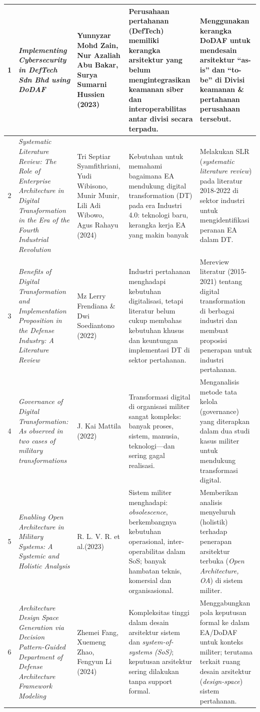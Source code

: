 \begin{longtable}{|c|p{3cm}|p{3cm}|p{3cm}|p{3cm}|}
1 & \textit{Implementing Cybersecurity in DefTech Sdn Bhd using DoDAF} 
& Yunnyzar Mohd Zain, Nur Azaliah Abu Bakar, Surya Sumarni Hussien (2023) \parencite{Zain2023}
& Perusahaan pertahanan (DefTech) memiliki kerangka arsitektur yang belum mengintegrasikan keamanan siber dan interoperabilitas antar divisi secara terpadu. 
& Menggunakan kerangka DoDAF untuk mendesain arsitektur “as-is” dan “to-be” di Divisi keamanan \& pertahanan perusahaan tersebut. \\
\hline
2 & \textit{Systematic Literature Review: The Role of Enterprise Architecture in Digital Transformation in the Era of the Fourth Industrial Revolution} 
& Tri Septiar Syamfithriani, Yudi Wibisono, Munir Munir, Lili Adi Wibowo, Agus Rahayu (2024) \parencite{Syamfithriani}
& Kebutuhan untuk memahami bagaimana EA mendukung digital transformation (DT) pada era Industri 4.0: teknologi baru, kerangka kerja EA yang makin banyak
& Melakukan SLR (\textit{systematic literature review}) pada literatur 2018-2022 di sektor industri untuk mengidentifikasi peranan EA dalam DT. \\
\hline
3 & \textit{Benefits of Digital Transformation and Implementation Proposition in the Defense Industry: A Literature Review}
& Mz Lerry Frendiana \& Dwi Soediantono (2022) \parencite{Frendiana2022}
& Industri pertahanan menghadapi kebutuhan digitalisasi, tetapi literatur belum cukup membahas kebutuhan khusus dan keuntungan implementasi DT di sektor pertahanan.
& Mereview literatur (2015-2021) tentang digital transformation di berbagai industri dan membuat proposisi penerapan untuk industri pertahanan. \\
\hline
4 & \textit{Governance of Digital Transformation: As observed in two cases of military transformations}
& J. Kai Mattila (2022) \parencite{Mattila2022}
& Transformasi digital di organisasi militer sangat kompleks: banyak proses, sistem, manusia, teknologi—dan sering gagal realisasi.
& Menganalisis metode tata kelola (governance) yang diterapkan dalam dua studi kasus militer untuk mendukung transformasi digital. \\
\hline
5 & \textit{Enabling Open Architecture in Military Systems: A Systemic and Holistic Analysis}
& R. L. V. R. et al.(2023) \parencite{Radoman2025}
& Sistem militer menghadapi: \textit{obsolescence}, berkembangnya kebutuhan operasional, inter-operabilitas dalam SoS; banyak hambatan teknis, komersial dan organisasional.
& Memberikan analisis menyeluruh (holistik) terhadap penerapan arsitektur terbuka (\textit{Open Architecture, OA}) di sistem militer. \\
\hline
6 & \textit{Architecture Design Space Generation via Decision Pattern-Guided Department of Defense Architecture Framework Modeling}
& Zhemei Fang, Xuemeng Zhao, Fengyun Li (2024) \parencite{Fang2024}
& Kompleksitas tinggi dalam desain arsitektur sistem dan \textit{system-of-systems (SoS)}; keputusan arsitektur sering dilakukan tanpa support formal.
& Menggabungkan pola keputusan formal ke dalam EA/DoDAF untuk konteks militer; terutama terkait ruang desain arsitektur (\textit{design-space}) sistem pertahanan. \\
\hline
\end{longtable}

